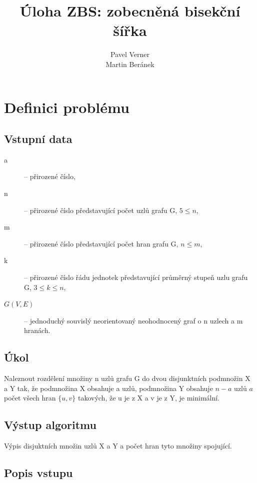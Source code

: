 \documentclass[a4paper,10pt]{report}
\begin{document}
\title{Úloha ZBS: zobecněná bisekční šířka}
\author{Pavel Verner \\ Martin Beránek}
\maketitle

\tableofcontents
\listoffigures
\listoftables
\newpage

\chapter{Definici problému}

\section{Vstupní data}

\begin{description}
	\item[a] -- přirozené číslo,
	\item[n] -- přirozené číslo představující počet uzlů grafu G, $5 \leq n$,
	\item[m] -- přirozené číslo představující počet hran grafu G, $n \leq m$,
	\item[k] -- přirozené číslo řádu jednotek představující průměrný stupeň uzlu grafu G, $3 \leq k \leq n$,
	\item[$G(V,E)$] -- jednoduchý souvislý neorientovaný neohodnocený graf o n uzlech a m hranách.
\end{description}

\section{Úkol}

Naleznout rozdělení množiny n uzlů grafu G do dvou disjunktních podmnožin X a Y tak, že podmnožina X obsahuje a uzlů, podmnožina Y obsahuje $n-a$ uzlů $a$ počet všech hran $\{u,v\}$ takových, že u je z X a v je z Y, je minimální.

\section{Výstup algoritmu}

Výpis disjuktních množin uzlů X a Y a počet hran tyto množiny spojující.

\section{Popis vstupu}
\end{document}

